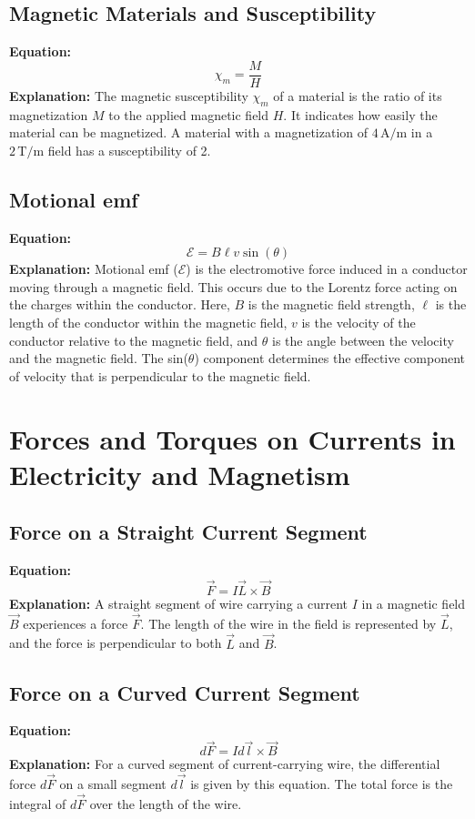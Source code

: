 \documentclass{article}
\begin{document}
\subsection*{Magnetic Materials and Susceptibility}
\textbf{Equation:} 
\[ \chi_m = \frac{M}{H} \]
\textbf{Explanation:} 
The magnetic susceptibility \( \chi_m \) of a material is the ratio of its magnetization \( M \) to the applied magnetic field \( H \). It indicates how easily the material can be magnetized.
A material with a magnetization of \( 4 \, \text{A/m} \) in a \( 2 \, \text{T/m} \) field has a susceptibility of 2.

\subsection*{Motional emf}
\textbf{Equation:} 
\[ \mathcal{E} = B \ell v \sin(\theta) \]
\textbf{Explanation:} 
Motional emf (\( \mathcal{E} \)) is the electromotive force induced in a conductor moving through a magnetic field. This occurs due to the Lorentz force acting on the charges within the conductor. Here, \( B \) is the magnetic field strength, \( \ell \) is the length of the conductor within the magnetic field, \( v \) is the velocity of the conductor relative to the magnetic field, and \( \theta \) is the angle between the velocity and the magnetic field. The sin(\( \theta \)) component determines the effective component of velocity that is perpendicular to the magnetic field.

\section*{Forces and Torques on Currents in Electricity and Magnetism}

\subsection*{Force on a Straight Current Segment}
\textbf{Equation:} 
\[ \vec{F} = I\vec{L} \times \vec{B} \]
\textbf{Explanation:} 
A straight segment of wire carrying a current \( I \) in a magnetic field \( \vec{B} \) experiences a force \( \vec{F} \). The length of the wire in the field is represented by \( \vec{L} \), and the force is perpendicular to both \( \vec{L} \) and \( \vec{B} \).

\subsection*{Force on a Curved Current Segment}
\textbf{Equation:} 
\[ d\vec{F} = I d\vec{l} \times \vec{B} \]
\textbf{Explanation:} 
For a curved segment of current-carrying wire, the differential force \( d\vec{F} \) on a small segment \( d\vec{l} \) is given by this equation. The total force is the integral of \( d\vec{F} \) over the length of the wire.
\end{document}
